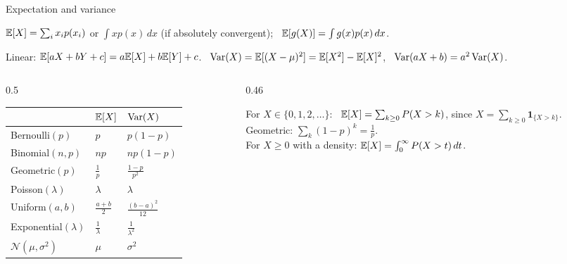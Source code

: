 \documentclass[aspectratio=1610,11pt]{beamer}
\begin{document}
\begin{frame}{Expectation and variance}
    \small
    \begin{definition}
        \small $\mathbb{E}[X] = \sum_ix_ip(x_i)$ or $\int xp(x)\,dx$ (if absolutely convergent); \ $\mathbb{E}[g(X)] = \int g(x)p(x)\,dx$.
    \end{definition}
    Linear: $\mathbb{E}[aX + bY + c] = a\mathbb{E}[X] + b\mathbb{E}[Y] + c$. \ $\operatorname{Var}(X) = \mathbb{E}[(X - \mu)^2] = \mathbb{E}[X^2] - \mathbb{E}[X]^2$, \ $\operatorname{Var}(aX + b) = a^2\operatorname{Var}(X)$.
    \begin{columns}[T]
        \begin{column}{0.5\linewidth}
            \centering\small
            \renewcommand{\arraystretch}{1.15}
            \begin{tabular}{@{}lll@{}}
                \toprule
                & $\mathbb{E}[X]$ & $\operatorname{Var}(X)$ \\
                \midrule
                Bernoulli$(p)$ & $p$ & $p(1 - p)$ \\
                Binomial$(n, p)$ & $np$ & $np(1 - p)$ \\
                Geometric$(p)$ & $\frac{1}{p}$ & $\frac{1 - p}{p^2}$ \\
                Poisson$(\lambda)$ & $\lambda$ & $\lambda$ \\
                Uniform$(a, b)$ & $\frac{a + b}{2}$ & $\frac{(b - a)^2}{12}$ \\
                Exponential$(\lambda)$ & $\frac{1}{\lambda}$ & $\frac{1}{\lambda^2}$ \\
                $\mathcal{N}(\mu, \sigma^2)$ & $\mu$ & $\sigma^2$ \\
                \bottomrule
            \end{tabular}
        \end{column}
        \begin{column}{0.46\linewidth}
            \begin{example}
                \small For $X \in \{0, 1, 2, \ldots\}$: \ $\mathbb{E}[X] = \sum_{k \geq 0}P(X > k)$, since $X = \sum_{k \geq 0}\mathbf{1}_{\{X > k\}}$. \\
                Geometric: $\sum_k(1 - p)^k = \frac{1}{p}$. \\
                For $X \geq 0$ with a density: $\mathbb{E}[X] = \int_0^\infty P(X > t)\,dt$.
            \end{example}
        \end{column}
    \end{columns}
\end{frame}
\end{document}
